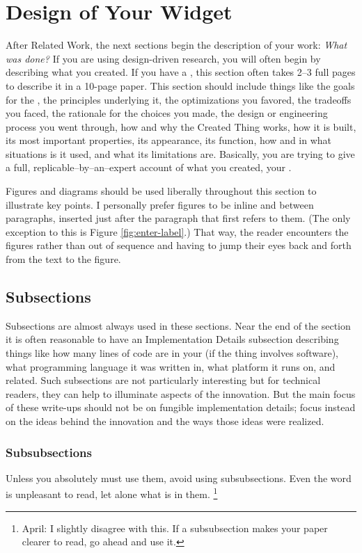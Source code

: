 \section{Design of Your Widget}
After Related Work, the next sections begin the description of your work: \emph{What was done?} 
If you are using design-driven research, you will often begin by describing what you created. 
If you have a \sysname{}, this section often takes 2--3 full pages to describe it in a 10-page paper. 
This section should include things like the goals for the \sysname{}, the principles underlying it, the optimizations you favored, the tradeoffs you faced, the rationale for the choices you made, the design or engineering process you went through, how and why the Created Thing works, how it is built, its most important properties, its appearance, its function, how and in what situations is it used, and what its limitations are. 
Basically, you are trying to give a full, replicable--by--an--expert account of what you created, your \sysname{}.

Figures and diagrams should be used liberally throughout this section to illustrate key points. 
I personally prefer figures to be inline and between paragraphs, inserted just after the paragraph that first refers to them. 
(The only exception to this is Figure \ref{fig:enter-label}.) 
That way, the reader encounters the figures  rather than out of sequence and having to jump their eyes back and forth from the text to the figure.

\subsection{Subsections}
Subsections are almost always used in these sections. 
Near the end of the section it is often reasonable to have an Implementation Details subsection describing things like how many lines of code are in your \sysname{} (if the thing involves software), what programming language it was written in, what platform it runs on, and related. 
Such subsections are not particularly interesting but for technical readers, they can help to illuminate aspects of the innovation.
But the main focus of these write-ups should not be on fungible implementation details; focus instead on the ideas behind the innovation and the ways those ideas were
realized.

\subsubsection{Subsubsections}
Unless you absolutely must use them, avoid using subsubsections. 
Even the word  is
unpleasant to read, let alone what is in them. \footnote{April: I slightly disagree with this. If a subsubsection makes your paper clearer to read, go ahead and use it.}